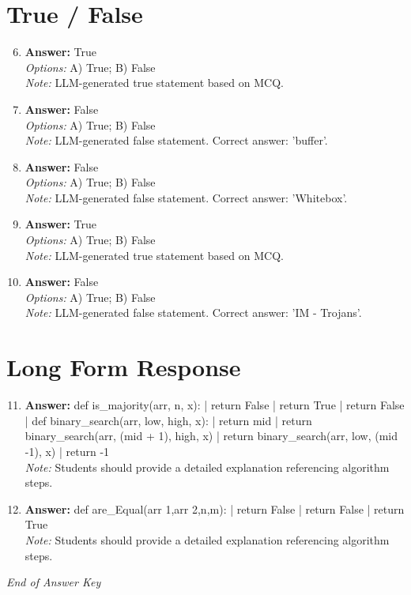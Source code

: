 \documentclass[12pt]{article}
\begin{document}
\section*{True / False}
\begin{enumerate}[label=\arabic*.]
\setcounter{enumi}{5}
\item \textbf{Answer:} True
\\ \textit{Options:} A) True; B) False
\\ \textit{Note:} LLM-generated true statement based on MCQ.
\item \textbf{Answer:} False
\\ \textit{Options:} A) True; B) False
\\ \textit{Note:} LLM-generated false statement. Correct answer: 'buffer'.
\item \textbf{Answer:} False
\\ \textit{Options:} A) True; B) False
\\ \textit{Note:} LLM-generated false statement. Correct answer: 'Whitebox'.
\item \textbf{Answer:} True
\\ \textit{Options:} A) True; B) False
\\ \textit{Note:} LLM-generated true statement based on MCQ.
\item \textbf{Answer:} False
\\ \textit{Options:} A) True; B) False
\\ \textit{Note:} LLM-generated false statement. Correct answer: 'IM - Trojans'.
\end{enumerate}

\section*{Long Form Response}
\begin{enumerate}[label=\arabic*.]
\setcounter{enumi}{10}
\item \textbf{Answer:} def is\_majority(arr, n, x): | return False | return True | return False | def binary\_search(arr, low, high, x): | return mid | return binary\_search(arr, (mid + 1), high, x) | return binary\_search(arr, low, (mid -1), x) | return -1
\\ \textit{Note:} Students should provide a detailed explanation referencing algorithm steps.
\item \textbf{Answer:} def are\_Equal(arr 1,arr 2,n,m): | return False | return False | return True
\\ \textit{Note:} Students should provide a detailed explanation referencing algorithm steps.
\end{enumerate}

\vfill
\noindent\textit{End of Answer Key}
\end{document}
